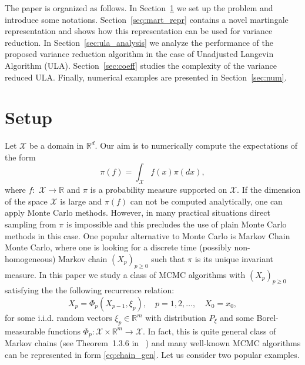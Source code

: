 \documentclass[article]{elsarticle}
\begin{document}
\par
The paper is organized as follows.  In Section~\ref{sec:setup} we set up the problem and introduce some notations. Section~\ref{seq:mart_repr} contains a novel martingale representation and shows how this representation can be used for variance reduction. In Section~\ref{sec:ula_analysis} we analyze the performance of the proposed variance reduction algorithm in the case of Unadjusted Langevin Algorithm (ULA). Section~\ref{sec:coeff} studies the complexity of the variance reduced ULA. Finally, numerical examples are presented in Section~\ref{sec:num}.
\section{Setup}\label{sec:setup}
Let  \(\mathcal{X}\) be a domain in \( \mathbb{R}^d.\)  Our aim is to numerically compute the expectations of the form
\[
\pi(f)=\int_{\mathcal{X}} f(x)\pi(dx),
\]
where \(f:\) \(\mathcal{X}\longrightarrow \mathbb{R}\) and \(\pi\) is a probability measure supported on \(\mathcal{X}.\)
If  the dimension of the space \(\mathcal{X}\) is large and \(\pi(f)\) can not be computed analytically, one can apply Monte Carlo methods. However, in many practical situations  direct sampling from \(\pi\) is impossible and this precludes the use of plain Monte Carlo methods in this case. One popular alternative to Monte Carlo  is Markov Chain Monte Carlo, where one is looking for a discrete time  (possibly non-homogeneous) Markov chain   \((X_p)_{p\geq 0}\) such that \(\pi\) is its unique invariant measure. In this paper we study a class of MCMC algorithms with \((X_p)_{p\geq 0}\) satisfying the  the following recurrence relation:
\begin{equation}\label{eq:chain_gen}
X_{p}=\Phi_{p}(X_{p-1},\xi_{p}),\quad p=1,2,\ldots ,\quad X_{0}=x_0,
\end{equation}
for some i.i.d.  random vectors \(\xi_p\in \mathbb{R}^m\) with distribution \(P_{\xi}\)
and some Borel-measurable
functions $\Phi_{p}\colon\mathcal{X}\times\mathbb{R}^{m}\to\mathcal{X}.$
In fact, this is quite general class of Markov chains (see Theorem~1.3.6 in ~\cite{moulines2018})
and many well-known MCMC algorithms can be represented in form \eqref{eq:chain_gen}.
Let us consider two popular examples.
\end{document}
